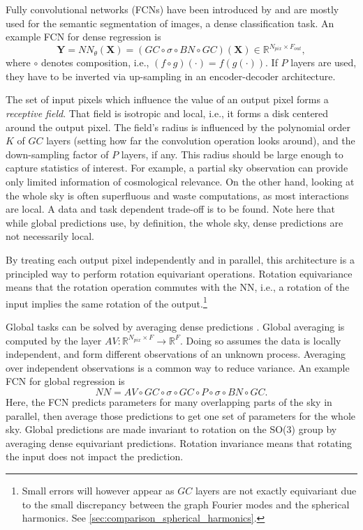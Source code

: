\documentclass[final,twocolumn,3p,times,sort&compress]{elsarticle}
\renewcommand{\b}[1]{{\bm{#1}}}   %
\newcommand{\1}{\b{1}}              %
\newcommand{\0}{\b{0}}              %
\newcommand{\X}{\b{X}}
\newcommand{\Y}{\b{Y}}
\newcommand{\R}{\mathbb{R}}
\begin{document}
Fully convolutional networks (FCNs) have been introduced by  \citep{long2015fcn} and are mostly used for the semantic segmentation of images, a dense classification task.
An example FCN for dense regression is
\begin{equation*}
	\Y = NN_\theta(\X) = (GC \circ \sigma \circ BN \circ GC)(\X) \in \R^{N_{pix} \times F_{out}},
\end{equation*}
where $\circ$ denotes composition, i.e., $(f \circ g)(\cdot) = f(g(\cdot))$.
If $P$ layers are used, they have to be inverted via up-sampling in an encoder-decoder architecture.

The set of input pixels which influence the value of an output pixel forms a \textit{receptive field}.
That field is isotropic and local, i.e., it forms a disk centered around the output pixel.
The field's radius is influenced by the polynomial order $K$ of $GC$ layers (setting how far the convolution operation looks around), and the down-sampling factor of $P$ layers, if any.
This radius should be large enough to capture statistics of interest.
For example, a partial sky observation can provide only limited information of cosmological relevance.
On the other hand, looking at the whole sky is often superfluous and waste computations, as most interactions are local.
A data and task dependent trade-off is to be found.
Note here that while global predictions use, by definition, the whole sky, dense predictions are not necessarily local.

By treating each output pixel independently and in parallel, this architecture is a principled way to perform rotation equivariant operations.
Rotation equivariance means that the rotation operation commutes with the NN, i.e., a rotation of the input implies the same rotation of the output.\footnote{Small errors will however appear as $GC$ layers are not exactly equivariant due to the small discrepancy between the graph Fourier modes and the spherical harmonics. See \ref{sec:comparison_spherical_harmonics}.}

Global tasks can be solved by averaging dense predictions \citep{lin2013globalavgpooling, springenberg2014allconv}.
Global averaging is computed by the layer $AV: \R^{N_{pix} \times F} \rightarrow \R^F$.
Doing so assumes the data is locally independent, and form different observations of an unknown process.
Averaging over independent observations is a common way to reduce variance.
An example FCN for global regression is
\begin{equation*}
	NN = AV \circ GC \circ \sigma \circ GC \circ P \circ \sigma \circ BN \circ GC.
\end{equation*}
Here, the FCN predicts parameters for many overlapping parts of the sky in parallel, then average those predictions to get one set of parameters for the whole sky.
Global predictions are made invariant to rotation on the SO(3) group by averaging dense equivariant predictions.
Rotation invariance means that rotating the input does not impact the prediction.
\end{document}
